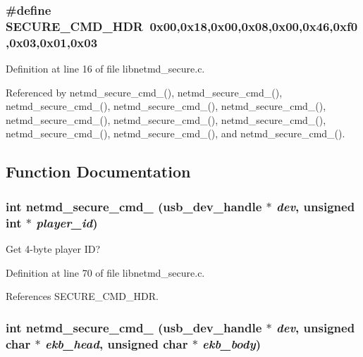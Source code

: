 \subsubsection[{SECURE\_\-CMD\_\-HDR}]{\setlength{\rightskip}{0pt plus 5cm}\#define SECURE\_\-CMD\_\-HDR~0x00,0x18,0x00,0x08,0x00,0x46,0xf0,0x03,0x01,0x03}\label{libnetmd__secure_8c_a6a443bfc9f9fc2f7ff041f66f8799dc3}


Definition at line 16 of file libnetmd\_\-secure.c.

Referenced by netmd\_\-secure\_\-cmd\_(), netmd\_\-secure\_\-cmd\_(), netmd\_\-secure\_\-cmd\_(), netmd\_\-secure\_\-cmd\_(), netmd\_\-secure\_\-cmd\_(), netmd\_\-secure\_\-cmd\_(), netmd\_\-secure\_\-cmd\_(), netmd\_\-secure\_\-cmd\_(), netmd\_\-secure\_\-cmd\_(), netmd\_\-secure\_\-cmd\_(), and netmd\_\-secure\_\-cmd\_().

\subsection{Function Documentation}
\subsubsection[{netmd\_\-secure\_\-cmd\_\-11}]{\setlength{\rightskip}{0pt plus 5cm}int netmd\_\-secure\_\-cmd\_ (usb\_\-dev\_\-handle $\ast$ {\em dev}, \/  unsigned int $\ast$ {\em player\_\-id})}\label{libnetmd__secure_8c_a32fb20a60c9091f46cd66095e27780ba}


Get 4-\/byte player ID? 

Definition at line 70 of file libnetmd\_\-secure.c.

References SECURE\_\-CMD\_\-HDR.
\subsubsection[{netmd\_\-secure\_\-cmd\_\-12}]{\setlength{\rightskip}{0pt plus 5cm}int netmd\_\-secure\_\-cmd\_ (usb\_\-dev\_\-handle $\ast$ {\em dev}, \/  unsigned char $\ast$ {\em ekb\_\-head}, \/  unsigned char $\ast$ {\em ekb\_\-body})}\label{libnetmd__secure_8c_a9d837fade5c5943f2a7ee46b36ff8f31}


